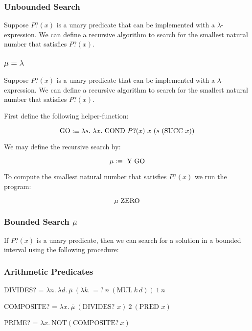 \documentclass{beamer}
\begin{document}
\begin{frame}
	\frametitle{Unbounded Search}

	Suppose $P?(x)$ is a unary predicate that can be implemented with a $\lambda$-expression. We can define a recursive algorithm to search for the smallest natural number that satisfies $P?(x)$. 

	\vspace{60mm}

\end{frame}

\begin{frame}
	\frametitle{$\mu = \lambda$}

	Suppose $P?(x)$ is a unary predicate that can be implemented with a $\lambda$-expression. We can define a recursive algorithm to search for the smallest natural number that satisfies $P?(x)$. 

	First define the following helper-function:

	$$\GO :\equiv \lambda s. \ \lambda x. \ \COND \ P?(x) \ x \ (s \ (\SUCC \ x))$$

	We may define the recursive search by: 

	$$\mu :\equiv \ \text{Y} \ \text{GO}$$ 

	To compute the smallest natural number that satisfies $P?(x)$ we run the program: 

	$$\mu \ \text{ZERO}$$

\end{frame}



\begin{frame}
	\frametitle{Bounded Search $\overline{\mu}$}

	If $P?(x)$ is a unary predicate, then we can search for a solution in a bounded interval using the following procedure:

	\vspace{65mm}



\end{frame}

\begin{frame}
	\frametitle{Arithmetic Predicates}

	DIVIDES? = $\lambda n. \ \lambda d. \ \overline{\mu} \ (\lambda k. \ =? \ n \ (\text{MUL} \ k \ d)) \ 1 \ n$

	\vspace{20mm}

	COMPOSITE? = $\lambda x. \ \overline{\mu} \ (\text{DIVIDES? } x) \ 2 \ (\text{PRED } x)$

	\vspace{20mm}
	
	PRIME? = $\lambda x. \ \text{NOT}( \text{COMPOSITE?} \ x)$

\end{frame}
\end{document}
